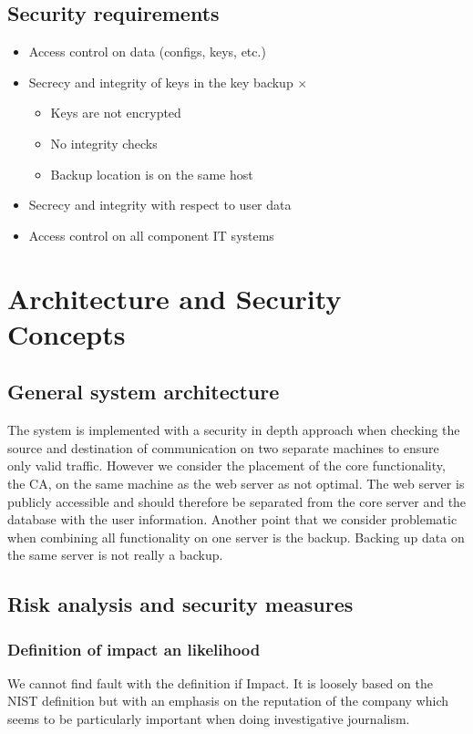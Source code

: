 \documentclass{report}
\begin{document}
\subsection{Security requirements}
\begin{itemize}
\item Access control on data (configs, keys, etc.) \checkmark
\item Secrecy and integrity of keys in the key backup $\times$
	\begin{itemize}
	\item Keys are not encrypted
	\item No integrity checks
	\item Backup location is on the same host
	\end{itemize}
\item Secrecy and integrity with respect to user data \checkmark
\item Access control on all component IT systems \checkmark
\end{itemize}

\section{Architecture and Security Concepts}
\subsection{General system architecture}
The system is implemented with a security in depth approach when checking the source and destination of communication on two separate machines to ensure only valid traffic. However we consider the placement of the core functionality, the CA, on the same machine as the web server as not optimal. The web server is publicly accessible and should therefore be separated from the core server and the database with the user information. Another point that we consider problematic when combining all functionality on one server is the backup. Backing up data on the same server is not really a backup.
\subsection{Risk analysis and security measures}
\subsubsection{Definition of impact an likelihood}
We cannot find fault with the definition if Impact. It is loosely based on the NIST definition but with an emphasis on the reputation of the company which seems to be particularly important when doing investigative journalism.
\end{document}
